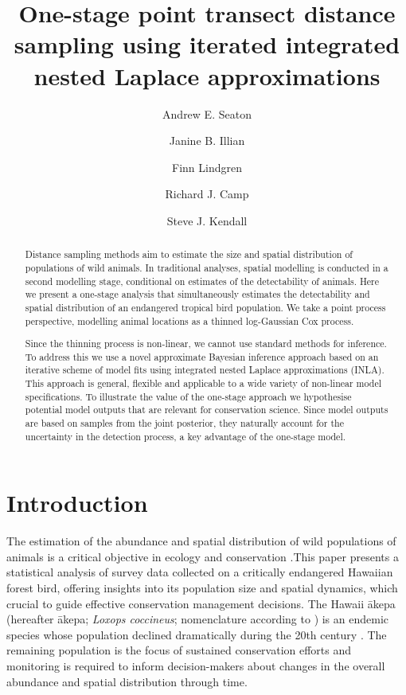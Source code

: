 \documentclass{statsoc}
\title[One-stage point transect distance sampling using iterated INLA]{One-stage point transect distance sampling using iterated integrated nested Laplace approximations}
\author[Andrew E. Seaton {\it et al.}]{Andrew E. Seaton}
\author{Janine B. Illian}
\author{Finn Lindgren}
\author{Richard J. Camp}
\author[Andrew E. Seaton \textit{et al.}]{Steve J. Kendall}
\newcommand{\akepa}{\textquotesingle\={a}kepa}  %
\newcommand{\hawaii}{Hawai\textquotesingle i}   %
\begin{document}
\begin{abstract}
Distance sampling methods aim to estimate the size and spatial distribution of populations of wild animals.  In traditional analyses, spatial modelling is conducted in a second modelling stage, conditional on estimates of the detectability of animals. Here we present a one-stage analysis that simultaneously estimates the detectability and spatial distribution of an endangered tropical bird population.  We take a point process perspective, modelling animal locations as a thinned log-Gaussian Cox process.

Since the thinning process is non-linear, we cannot use standard methods for inference. To address this we use a novel approximate Bayesian inference approach based on an iterative scheme of model fits using integrated nested Laplace approximations (INLA).  This approach is general, flexible and applicable to a wide variety of non-linear model specifications. To illustrate the value of the one-stage approach we hypothesise potential model outputs that are relevant for conservation science.  Since model outputs are based on samples from the joint posterior, they naturally account for the uncertainty in the detection process, a key advantage of the one-stage model. 

\end{abstract}


\section{Introduction}

The estimation of the abundance and spatial distribution of wild populations of animals is a critical objective in ecology and conservation \citep{schwarz_estimating_1999}.This paper presents a statistical analysis of survey data collected on a critically endangered Hawaiian forest bird, offering insights into its population size and spatial dynamics, which crucial to guide effective conservation management decisions.  The \hawaii{} \akepa{} (hereafter \akepa{}; \textit{Loxops coccineus}; nomenclature according to \citealp{usfws_akepa_1970}) is an endemic species whose population declined dramatically during the 20th century  \citep{usfws_revised_2006, judge_akepa_2018}.  The remaining population is the focus of sustained conservation efforts and monitoring is required to inform decision-makers about changes in the overall abundance and spatial distribution through time.  
\end{document}
